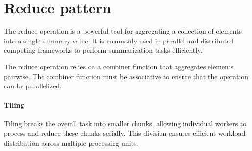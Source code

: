 \section{Reduce pattern}

The reduce operation is a powerful tool for aggregating a collection of elements into a single summary value. 
It is commonly used in parallel and distributed computing frameworks to perform summarization tasks efficiently.

The reduce operation relies on a combiner function that aggregates elements pairwise. 
The combiner function must be associative to ensure that the operation can be parallelized. 

\paragraph*{Tiling}
Tiling breaks the overall task into smaller chunks, allowing individual workers to process and reduce these chunks serially. 
This division ensures efficient workload distribution across multiple processing units.